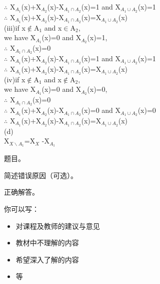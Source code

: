 \documentclass[11pt, a4paper, UTF8]{ctexart}
\begin{document}
\begin{solution}
$\therefore$ X$_{A_1}$(x)+X$_{A_2}$(x)-X$_{A_1 \cap A_2}$(x)=1 and X$_{A_1 \cup A_2}$(x)=1\\
$\therefore$ X$_{A_1}$(x)+X$_{A_2}$(x)-X$_{A_1 \cap A_2}$(x)=X$_{A_1 \cup A_2}$(x)\\
(iii)if x$\notin$A$_1$ and x$\in$A$_2$,\\
we have X$_{A_1}$(x)=0 and X$_{A_2}$(x)=1, \\
$\therefore$  X$_{A_1 \cap A_2}$(x)=0\\
$\therefore$ X$_{A_1}$(x)+X$_{A_2}$(x)-X$_{A_1 \cap A_2}$(x)=1 and X$_{A_1 \cup A_2}$(x)=1\\
$\therefore$ X$_{A_1}$(x)+X$_{A_2}$(x)-X$_{A_1 \cap A_2}$(x)=X$_{A_1 \cup A_2}$(x)\\
(iv)if x$\notin$A$_1$ and x$\notin$A$_2$, \\
we have X$_{A_1}$(x)=0 and X$_{A_2}$(x)=0, \\
$\therefore$  X$_{A_1 \cap A_2}$(x)=0\\
$\therefore$ X$_{A_1}$(x)+X$_{A_2}$(x)-X$_{A_1 \cap A_2}$(x)=0 and X$_{A_1 \cup A_2}$(x)=0\\
$\therefore$ X$_{A_1}$(x)+X$_{A_2}$(x)-X$_{A_1 \cap A_2}$(x)=X$_{A_1 \cup A_2}$(x)\\
(d)\\
X$_{X\backslash A_1}$=X$_X$ -X$_{A_1}$\\
\end{solution}


\begincorrection	%

\begin{problem}[题号]
  题目。
\end{problem}

\begin{cause}
  简述错误原因（可选）。
\end{cause}

\begin{revision}
  正确解答。
\end{revision}
\beginfb	%

你可以写：
\begin{itemize}
  \item 对课程及教师的建议与意见
  \item 教材中不理解的内容
  \item 希望深入了解的内容
  \item 等
\end{itemize}
\end{document}
